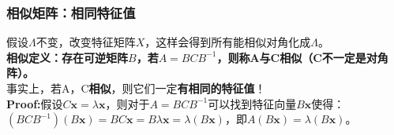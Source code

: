     \subsubsection{相似矩阵：相同特征值}
    假设$\Lambda$不变，改变特征矩阵$X$，这样会得到所有能相似对角化成$\Lambda$。\\
    \textbf{相似定义：存在可逆矩阵$B$，若$A=B C B^{-1}$，则称A与C相似（C不一定是对角阵）。}\\
    事实上，若A，C\textbf{相似}，则它们一定\textbf{有相同的特征值}！\\
    \textbf{Proof:}假设$C \boldsymbol{x}=\lambda \boldsymbol{x}$，则对于$A=B C B^{-1}$可以找到特征向量$B \boldsymbol{x}$使得：$\left(B C B^{-1}\right)(B \boldsymbol{x})=B C \boldsymbol{x}=B \lambda \boldsymbol{x}=\lambda(B \boldsymbol{x})$，即$A(B\bm{x})=\lambda (B\bm{x})$。

